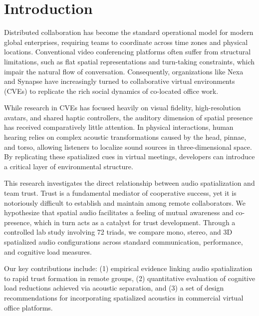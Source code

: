 \section{Introduction}
Distributed collaboration has become the standard operational model for modern global enterprises, requiring teams to coordinate across time zones and physical locations. Conventional video conferencing platforms often suffer from structural limitations, such as flat spatial representations and turn-taking constraints, which impair the natural flow of conversation. Consequently, organizations like Nexa and Synapse have increasingly turned to collaborative virtual environments (CVEs) to replicate the rich social dynamics of co-located office work.

While research in CVEs has focused heavily on visual fidelity, high-resolution avatars, and shared haptic controllers, the auditory dimension of spatial presence has received comparatively little attention. In physical interactions, human hearing relies on complex acoustic transformations caused by the head, pinnae, and torso, allowing listeners to localize sound sources in three-dimensional space. By replicating these spatialized cues in virtual meetings, developers can introduce a critical layer of environmental structure.

This research investigates the direct relationship between audio spatialization and team trust. Trust is a fundamental mediator of cooperative success, yet it is notoriously difficult to establish and maintain among remote collaborators. We hypothesize that spatial audio facilitates a feeling of mutual awareness and co-presence, which in turn acts as a catalyst for trust development. Through a controlled lab study involving 72 triads, we compare mono, stereo, and 3D spatialized audio configurations across standard communication, performance, and cognitive load measures.

Our key contributions include: (1) empirical evidence linking audio spatialization to rapid trust formation in remote groups, (2) quantitative evaluation of cognitive load reductions achieved via acoustic separation, and (3) a set of design recommendations for incorporating spatialized acoustics in commercial virtual office platforms.
